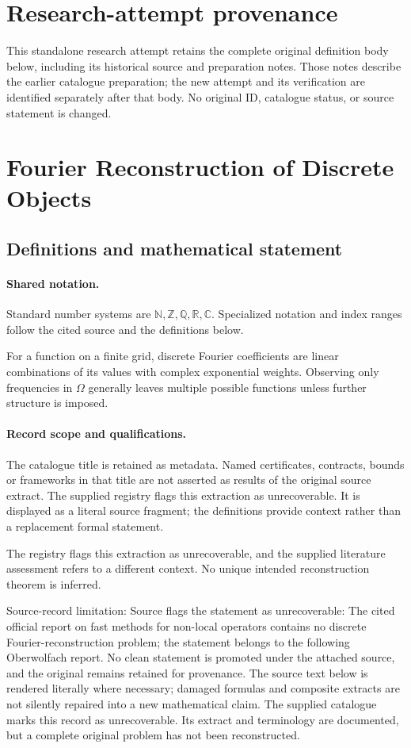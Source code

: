 \documentclass[11pt]{article}
\begin{document}
\section*{Research-attempt provenance}
This standalone research attempt retains the complete original definition body below,
including its historical source and preparation notes. Those notes describe the
earlier catalogue preparation; the new attempt and its verification are identified
separately after that body. No original ID, catalogue status, or source statement is changed.

\section{Fourier Reconstruction of Discrete Objects}\label{statement}

\subsection{Definitions and mathematical statement}

\paragraph{Shared notation.}Standard number systems are $\mathbb N,\mathbb Z,\mathbb Q,\mathbb R,\mathbb C$. Specialized notation and index ranges follow the cited source and the definitions below.


For a function on a finite grid, discrete Fourier coefficients are linear combinations of its values with complex exponential weights. Observing only frequencies in $\Omega$ generally leaves multiple possible functions unless further structure is imposed.
\paragraph{Record scope and qualifications.}
The catalogue title is retained as metadata. Named certificates, contracts, bounds or frameworks in that title are not asserted as results of the original source extract.
The supplied registry flags this extraction as unrecoverable. It is displayed as a literal source fragment; the definitions provide context rather than a replacement formal statement.

The registry flags this extraction as unrecoverable, and the supplied literature assessment refers to a different context. No unique intended reconstruction theorem is inferred.

Source-record limitation: Source flags the statement as unrecoverable: The cited official report on fast methods for non-local operators contains no discrete Fourier-reconstruction problem; the statement belongs to the following Oberwolfach report. No clean statement is promoted under the attached source, and the original remains retained for provenance.
The source text below is rendered literally where necessary; damaged formulas and composite extracts are not silently repaired into a new mathematical claim.
The supplied catalogue marks this record as unrecoverable. Its extract and terminology are documented, but a complete original problem has not been reconstructed.
\end{document}
